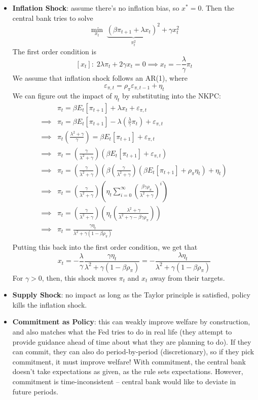 \documentclass[12pt]{article}
\begin{document}
\begin{itemize}
    \item \textbf{Inflation Shock}: assume there's no inflation bias, so $x^* = 0$. Then the central bank tries to solve
    \[\min_{x_t}\; \underbrace{\left(\beta \pi_{t+1} + \lambda x_t\right)^2}_{\pi_t^2} + \gamma x_t^2\]
    The first order condition is
    \[[x_t]:\; 2\lambda\pi_t + 2\gamma x_t = 0 \implies x_t = -\frac{\lambda}{\gamma}\pi_t\]
    We assume that inflation shock follows an AR(1), where
    \[\varepsilon_{\pi,t} = \rho_{\pi}\varepsilon_{\pi,t-1} + \eta_t\]
    We can figure out the impact of $\eta_t$ by substituting into the NKPC:
    \[\begin{split}
        &\pi_t = \beta E_t[\pi_{t+1}] + \lambda x_t + \varepsilon_{\pi,t} \\
        \implies &\pi_t = \beta E_t[\pi_{t+1}] - \lambda \left(\frac{\lambda}{\gamma}\pi_t\right) + \varepsilon_{\pi,t} \\
        \implies &\pi_t\left(\frac{\lambda^2 + \gamma}{\gamma}\right) = \beta E_t[\pi_{t+1}] + \varepsilon_{\pi,t} \\
        \implies &\pi_t = \left(\frac{\gamma}{\lambda^2 + \gamma}\right)\left(\beta E_t[\pi_{t+1}] + \varepsilon_{\pi,t}\right) \\
        \implies &\pi_t = \left(\frac{\gamma}{\lambda^2 + \gamma}\right)\left(\beta \left(\frac{\gamma}{\lambda^2 + \gamma}\right)\left(\beta E_t[\pi_{t+1}] + \rho_{\pi}\eta_t\right) + \eta_t\right) \\
        \implies &\pi_t = \left(\frac{\gamma}{\lambda^2 + \gamma}\right)\left(\eta_t\sum_{i=0}^{\infty}\left(\frac{\beta \gamma \rho_{\pi}}{\lambda^2 + \gamma}\right)^i\right) \\
        \implies &\pi_t = \left(\frac{\gamma}{\lambda^2 + \gamma}\right)\left(\eta_t\left(
        \frac{\lambda^2 + \gamma}{\lambda^2 + \gamma - \beta \gamma\rho_{\pi}}\right)\right) \\
        \implies &\pi_t = 
        \frac{\gamma \eta_t}{\lambda^2 + \gamma(1 - \beta \rho_{\pi})} \\
    \end{split}\]
    Putting this back into the first order condition, we get that
    \[x_t = -\frac{\lambda}{\gamma}\frac{\gamma \eta_t}{\lambda^2 + \gamma(1 - \beta \rho_{\pi})} = -\frac{\lambda \eta_t}{\lambda^2 + \gamma(1 - \beta \rho_{\pi})}\]
    For $\gamma >0$, then, this shock moves $\pi_t$ and $x_t$ away from their targets.
    \item \textbf{Supply Shock}: no impact as long as the Taylor principle is satisfied, policy kills the inflation shock. 
    \item \textbf{Commitment as Policy}: this can weakly improve welfare by construction, and also matches what the Fed tries to do in real life (they attempt to provide guidance ahead of time about what they are planning to do). If they can commit, they can also do period-by-period (discretionary), so if they pick commitment, it must improve welfare! With commitment, the central bank doesn't take expectations as given, as the rule sets expectations. However, commitment is time-inconsistent -- central bank would like to deviate in future periods.
\end{itemize}
\end{document}
